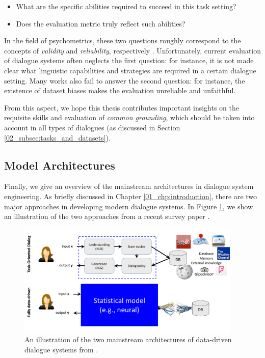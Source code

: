 \begin{itemize}
	\item What are the specific abilities required to succeed in this task setting?
	\item Does the evaluation metric truly reflect such abilities?
\end{itemize}

In the field of psychometrics, these two questions roughly correspond to the concepts of \textit{validity} and \textit{reliability}, respectively \citep{cook2006current}. Unfortunately, current evaluation of dialogue systems often neglects the first question: for instance, it is not made clear what linguistic capabilities and strategies are required in a certain dialogue setting. Many works also fail to answer the second question: for instance, the existence of dataset biases makes the evaluation unreliable and unfaithful.

From this aspect, we hope this thesis contributes important insights on the requisite skills and evaluation of \textit{common grounding}, which should be taken into account in all types of dialogues (as discussed in Section \ref{02_subsec:tasks_and_datasets}).

\subsection{Model Architectures}
\label{02_subsec:models}

Finally, we give an overview of the mainstream architectures in dialogue system engineering. As briefly discussed in Chapter \ref{01_chp:introduction}, there are two major approaches in developing modern dialogue systems. In Figure \ref{02_fig:two_dialogue_systems}, we show an illustration of the two approaches from a recent survey paper \citep{gao2019neural}.\\

\begin{figure}[th!]
\centering
\includegraphics[width=0.95\textwidth]{two-dialogue-system.pdf}
\caption{An illustration of the two mainstream architectures of data-driven dialogue systems from \citet{gao2019neural}.
}
\label{02_fig:two_dialogue_systems}
\end{figure}

